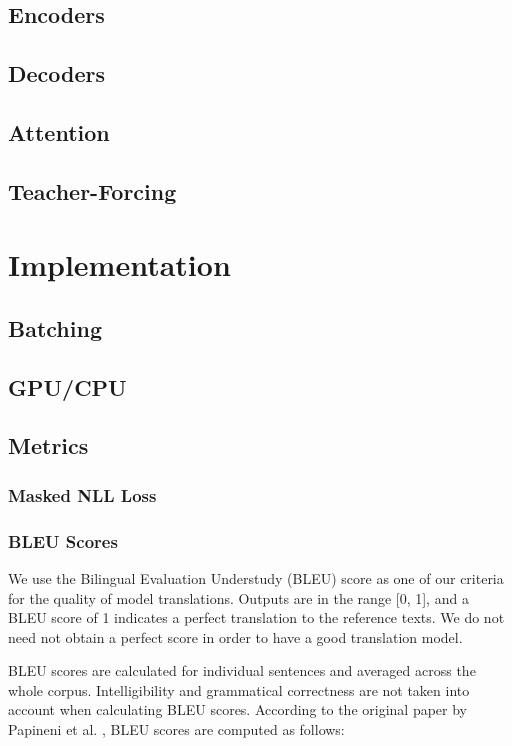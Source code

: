 \documentclass[twoside,twocolumn]{article}
\begin{document}
\subsection{Encoders}
\subsection{Decoders}
\subsection{Attention}
\subsection{Teacher-Forcing}
\section{Implementation}
\label{sec:implementation}
\subsection{Batching}
\subsection{GPU/CPU}
\subsection{Metrics}
\subsubsection{Masked NLL Loss}
\subsubsection{BLEU Scores}
We use the Bilingual Evaluation Understudy (BLEU) score as one of our criteria
for the quality of model translations. Outputs are in the range [0, 1], and a
BLEU score of 1 indicates a perfect translation to the reference texts.
We do not need not obtain a perfect score in order to have a good
translation model.

BLEU scores are calculated for individual sentences and averaged across the
whole corpus. Intelligibility and grammatical correctness are not taken into
account when calculating BLEU scores. According to the original paper by
Papineni et al. \cite{papineni2002bleu}, BLEU scores are computed as follows:
\end{document}
